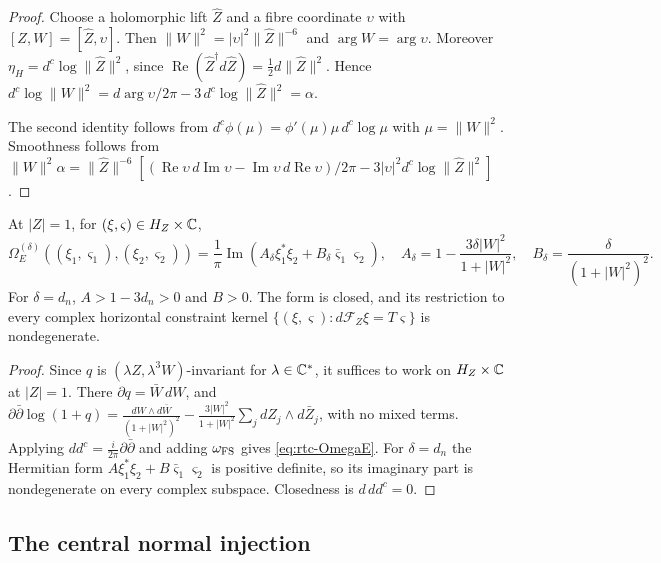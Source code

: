 \begin{proof}
Choose a holomorphic lift $\hat Z$ and a fibre coordinate $\upsilon$ with $[Z,W]=[\hat Z,\upsilon]$. Then $\|W\|^2=|\upsilon|^2\|\hat Z\|^{-6}$ and $\arg W=\arg\upsilon$. Moreover $\eta_H=d^c\log\|\hat Z\|^2$, since $\operatorname{Re}(\hat Z^\dagger d\hat Z)=\frac12d\|\hat Z\|^2$. Hence $d^c\log\|W\|^2=d\arg\upsilon/2\pi-3\,d^c\log\|\hat Z\|^2=\alpha$.

The second identity follows from $d^c\phi(\mu)=\phi'(\mu)\mu\,d^c\log\mu$ with $\mu=\|W\|^2$. Smoothness follows from $\|W\|^2\alpha=\|\hat Z\|^{-6}[(\operatorname{Re}\upsilon\,d\operatorname{Im}\upsilon-\operatorname{Im}\upsilon\,d\operatorname{Re}\upsilon)/2\pi-3|\upsilon|^2d^c\log\|\hat Z\|^2]$.
\end{proof}

\begin{lemma}\label{lem:rtc-kahler}
At $|Z|=1$, for $(\xi,\varsigma)\in H_Z\times\mathbb{C}$,
\begin{equation}\label{eq:rtc-OmegaE}
 \Omega_E^{(\delta)}((\xi_1,\varsigma_1),(\xi_2,\varsigma_2))
 =\frac1\pi\operatorname{Im}(A_\delta\xi_1^*\xi_2+B_\delta\bar\varsigma_1\varsigma_2),\quad
 A_\delta=1-\frac{3\delta|W|^2}{1+|W|^2},\quad B_\delta=\frac{\delta}{(1+|W|^2)^2}.
\end{equation}
For $\delta=d_n$, $A>1-3d_n>0$ and $B>0$.
The form is closed, and its restriction to every complex horizontal constraint kernel
$\{(\xi,\varsigma):d\mathcal F_Z\xi=T\varsigma\}$ is nondegenerate.
\end{lemma}

\begin{proof}
Since $q$ is $(\lambda Z,\lambda^3W)$-invariant for $\lambda\in\mathbb{C}^*$, it suffices to work on $H_Z\times\mathbb{C}$ at $|Z|=1$. There $\partial q=\bar W\,dW$, and
$\partial\bar\partial\log(1+q)=\frac{dW\wedge d\bar W}{(1+|W|^2)^2}-\frac{3|W|^2}{1+|W|^2}\sum_jdZ_j\wedge d\bar Z_j$, with no mixed terms. Applying $dd^c=\frac i{2\pi}\partial\bar\partial$ and adding $\omega_{\rm FS}$ gives \eqref{eq:rtc-OmegaE}. For $\delta=d_n$ the Hermitian form $A\xi_1^*\xi_2+B\bar\varsigma_1\varsigma_2$ is positive definite, so its imaginary part is nondegenerate on every complex subspace. Closedness is $d\,dd^c=0$.
\end{proof}

\subsection{The central normal injection}\label{sec:rtc-injection}

